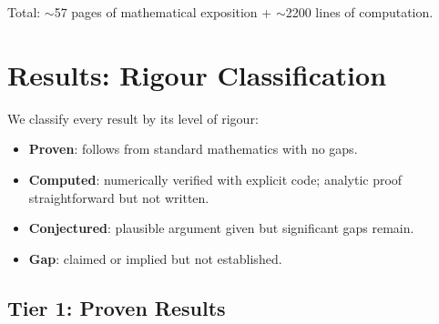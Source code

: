 \documentclass[12pt,a4paper]{article}
\begin{document}
Total: $\sim$57 pages of mathematical exposition + $\sim$2200 lines of computation.

\section{Results: Rigour Classification}

We classify every result by its level of rigour:
\begin{itemize}[leftmargin=*]
\item[\textcolor{proven}{$\blacksquare$}] \textbf{Proven}: follows from standard mathematics with no gaps.
\item[\textcolor{computed}{$\blacksquare$}] \textbf{Computed}: numerically verified with explicit code; analytic proof straightforward but not written.
\item[\textcolor{conjecture}{$\blacksquare$}] \textbf{Conjectured}: plausible argument given but significant gaps remain.
\item[\textcolor{gap}{$\blacksquare$}] \textbf{Gap}: claimed or implied but not established.
\end{itemize}

\subsection{Tier 1: Proven Results}
\end{document}
